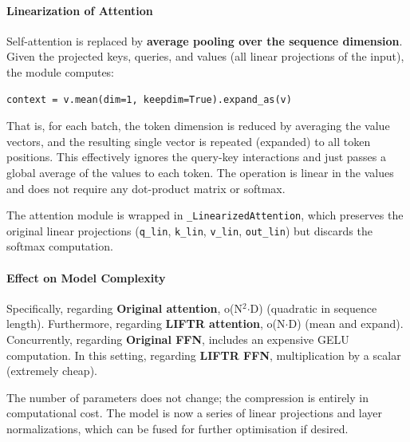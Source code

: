 \paragraph{Linearization of Attention}

Self-attention is replaced by \textbf{average pooling over the sequence dimension}. Given the projected keys, queries, and values (all linear projections of the input), the module computes:

\vspace{0.5em}
\begin{mdframed}[backgroundcolor=codebg, linecolor=codeframe, linewidth=1pt, roundcorner=4pt, innerleftmargin=2pt, innerrightmargin=5pt, innertopmargin=5pt, innerbottommargin=5pt]
\begin{lstlisting}
context = v.mean(dim=1, keepdim=True).expand_as(v)
\end{lstlisting}
\end{mdframed}
\vspace{0.5em}

That is, for each batch, the token dimension is reduced by averaging the value vectors, and the resulting single vector is repeated (expanded) to all token positions. This effectively ignores the query-key interactions and just passes a global average of the values to each token. The operation is linear in the values and does not require any dot-product matrix or softmax.

The attention module is wrapped in \texttt{\_LinearizedAttention}, which preserves the original linear projections (\texttt{q\_lin}, \texttt{k\_lin}, \texttt{v\_lin}, \texttt{out\_lin}) but discards the softmax computation.

\paragraph{Effect on Model Complexity}

Specifically, regarding \textbf{Original attention}, o(N$^2$$\cdot$D) (quadratic in sequence length). Furthermore, regarding \textbf{LIFTR attention}, o(N$\cdot$D) (mean and expand). Concurrently, regarding \textbf{Original FFN}, includes an expensive GELU computation. In this setting, regarding \textbf{LIFTR FFN}, multiplication by a scalar (extremely cheap).


The number of parameters does not change; the compression is entirely in computational cost. The model is now a series of linear projections and layer normalizations, which can be fused for further optimisation if desired.

